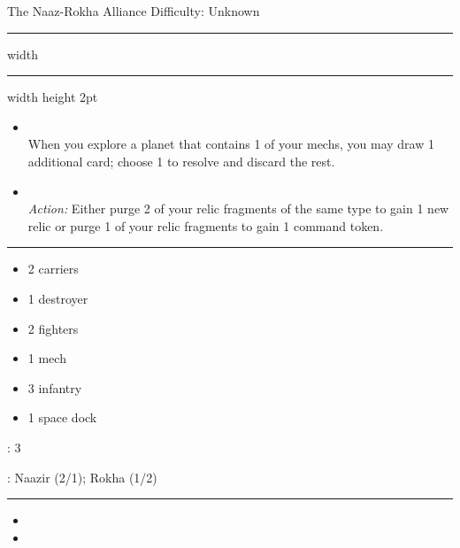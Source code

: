 {\handel\Huge The Naaz-Rokha Alliance} \hfill {\Large Difficulty: Unknown} \vspace{-4pt}\\
\hrule width \hsize \kern 1mm \hrule width \hsize height 2pt


\begin{multicols}{2}


\begin{itemize}
\item {}\\
When you explore a planet that contains 1 of your mechs, you may draw 1 additional card; choose 1 to resolve and discard the rest.
\item {} \\
\emph{Action:} Either purge 2 of your relic fragments of the same type to gain 1 new relic or purge 1 of your relic fragments to gain 1 command token.
\end{itemize}


\vspace{-10pt}\rule{\hsize}{0.4pt}\vspace{5pt}


\vspace{-5pt}
\begin{multicols}{2}
\begin{itemize}
\item 2 carriers
\item 1 destroyer
\item 2 fighters
\item 1 mech
\item 3 infantry
\item 1 space dock
\end{itemize}
\end{multicols}

\vspace{-5pt}
: 3

\vspace{2pt}
: Naazir (2/1); Rokha (1/2)

\rule{\hsize}{0.4pt}\vspace{5pt}


\begin{itemize}
\item \psycho
\item \development
\end{itemize}


\end{multicols}

